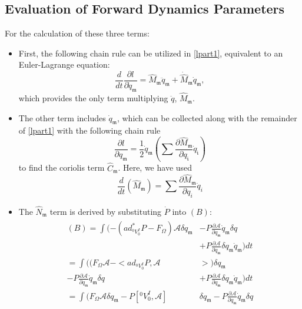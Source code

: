 \documentclass[lettersize,journal]{IEEEtran}
\def \A {\mathcal{A}}
\theoremstyle{remark}
\begin{document}
\subsection{Evaluation of Forward Dynamics Parameters}
For the calculation of these three terms:
\begin{itemize}
    \item First, the following chain rule can be utilized in \eqref{lpart1}, equivalent to an Euler-Lagrange equation:
\begin{equation}
    \frac{d}{dt}\frac{\partial l}{\partial \dot{q}_\mathfrak{m}}={\hat{M}}_\mathfrak{m}\ddot{q}_\mathfrak{m}+\dot{\hat{M}}_\mathfrak{m}\dot{q}_\mathfrak{m},
\end{equation}
which provides the only term multiplying $\ddot{q}$, $\hat{M}_\mathfrak{m}$.
\item The other term includes $\dot{q}_\mathfrak{m}$, which can be collected along with the remainder of \eqref{lpart1} with the following chain rule
\begin{equation}
    \frac{\partial l}{\partial q_\mathfrak{m}}=\frac{1}{2}\dot{q}_\mathfrak{m}(\sum\frac{\partial {\hat{M}}_\mathfrak{m}}{\partial q_\mathfrak{i}}\dot{q}_\mathfrak{i})
\end{equation}
to find the coriolis term $\hat{C}_\mathfrak{m}$. Here, we have used
\begin{equation}
    {\frac{d}{dt}(\hat{M}_\mathfrak{m})}=\sum\frac{\partial \hat{M}_\mathfrak{m}}{\partial{q}_i}\dot{q}_i
\end{equation}
\item The $\hat{N}_\mathfrak{m}$ term is derived by substituting $\dot{P}$ into $(B)$:
\begin{align}
\begin{split}
    (B) = \int (-(ad_{^0V^I_0}^*P-F_{\Omega})\A\delta q_\mathfrak{m}&-P\frac{\partial \A}{\partial q_\mathfrak{m}}\dot{q}_\mathfrak{m}\delta q\\
    &+P\frac{\partial \A}{\partial q_\mathfrak{m}}\delta q_\mathfrak{m} \dot{q}_\mathfrak{m})dt\\
    = \int ((F_{\Omega}\A-<ad_{{}^0V^I_0}P,\A&>)\delta q_\mathfrak{m}\\-P\frac{\partial \A}{\partial q_\mathfrak{m}}\dot{q}_\mathfrak{m}\delta q
    &+P\frac{\partial \A}{\partial q_\mathfrak{m}}\delta q_\mathfrak{m} \dot{q}_\mathfrak{m})dt\\
    = \int (F_{\Omega}\A\delta q_\mathfrak{m}-P[{}^0V^I_0,\A]&\delta q_\mathfrak{m}-P\frac{\partial \A}{\partial q_\mathfrak{m}}\dot{q}_\mathfrak{m}\delta q\\

\end{split}
\end{align}
\end{itemize}
\end{document}
